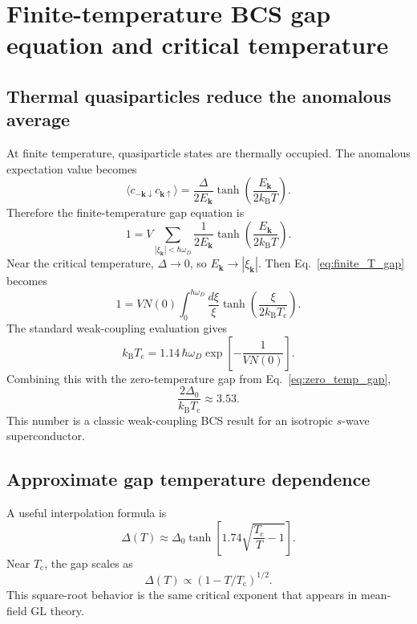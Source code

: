\documentclass[11pt]{article}
\numberwithin{equation}{section}
\newcommand{\kB}{k_{\mathrm{B}}}
\newcommand{\kvec}{\bm{k}}
\newcommand{\Tc}{T_{\mathrm{c}}}
\newcommand{\Deltaz}{\Delta_0}
\newcommand{\Nzero}{N(0)}
\begin{document}
\section{Finite-temperature BCS gap equation and critical temperature}

\subsection{Thermal quasiparticles reduce the anomalous average}

At finite temperature, quasiparticle states are thermally occupied. The anomalous expectation value becomes
\begin{equation}
\langle c_{-\kvec\downarrow}c_{\kvec\uparrow}\rangle
=\frac{\Delta}{2E_{\kvec}}\tanh\left(\frac{E_{\kvec}}{2\kB T}\right).
\end{equation}
Therefore the finite-temperature gap equation is
\begin{equation}
\boxed{1=V\sum_{|\xi_{\kvec}|<\hbar\omega_D}\frac{1}{2E_{\kvec}}\tanh\left(\frac{E_{\kvec}}{2\kB T}\right).}
\label{eq:finite_T_gap}
\end{equation}
Near the critical temperature, $\Delta\to 0$, so $E_{\kvec}\to |\xi_{\kvec}|$. Then Eq.~\eqref{eq:finite_T_gap} becomes
\begin{equation}
1=V\Nzero\int_0^{\hbar\omega_D}\frac{d\xi}{\xi}\tanh\left(\frac{\xi}{2\kB \Tc}\right).
\end{equation}
The standard weak-coupling evaluation gives
\begin{equation}
\kB\Tc=1.14\,\hbar\omega_D\exp\left[-\frac{1}{V\Nzero}\right].
\end{equation}
Combining this with the zero-temperature gap from Eq.~\eqref{eq:zero_temp_gap},
\begin{equation}
\boxed{\frac{2\Deltaz}{\kB\Tc}\approx 3.53.}
\end{equation}
This number is a classic weak-coupling BCS result for an isotropic $s$-wave superconductor.

\subsection{Approximate gap temperature dependence}

A useful interpolation formula is
\begin{equation}
\Delta(T)\approx \Deltaz\tanh\left[1.74\sqrt{\frac{\Tc}{T}-1}\right].
\end{equation}
Near $\Tc$, the gap scales as
\begin{equation}
\Delta(T)\propto (1-T/\Tc)^{1/2}.
\end{equation}
This square-root behavior is the same critical exponent that appears in mean-field GL theory.
\end{document}
